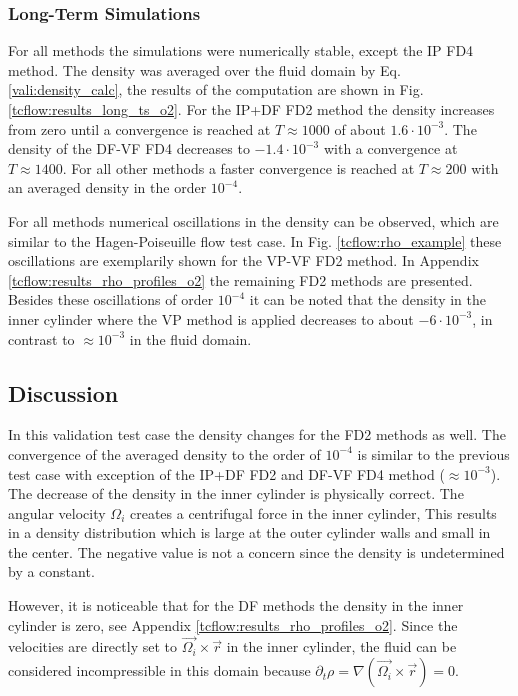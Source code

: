 \clearpage

\subsubsection{Long-Term Simulations}

For all methods the simulations were numerically stable, except the IP FD4 method.
The density was averaged over the fluid domain by Eq. \ref{vali:density_calc},
the results of the computation are shown in Fig. \ref{tcflow:results_long_ts_o2}.
For the IP+DF FD2 method the density increases from zero until a convergence is reached at $T\approx 1000$ of about $1.6\cdot10^{-3}$.
The density of the  DF-VF FD4 decreases to $-1.4\cdot10^{-3}$ with a convergence at $T\approx1400$.
For all other methods a faster convergence is reached at $T\approx200$ with an  averaged density in the order $10^{-4}$.

For all methods numerical oscillations in the density can be
observed, which  are similar to the Hagen-Poiseuille flow test case.
In Fig. \ref{tcflow:rho_example} these oscillations are exemplarily shown for the VP-VF FD2 method.
In Appendix \ref{tcflow:results_rho_profiles_o2} the remaining FD2 methods are presented.
Besides these oscillations of order $10^{-4}$ it can be noted that the density in the inner cylinder
where the VP method is applied decreases to about $-6\cdot10^{-3}$, in contrast to $\approx10^{-3}$ in the fluid domain.

\subsection{Discussion}

In this validation test case the density changes for the FD2 methods as well.
The convergence of the averaged density to the order of $10^{-4}$
is similar to the previous test case with exception of the IP+DF FD2 and DF-VF FD4 method ($\approx10^{-3}$).
The decrease of the density in the inner cylinder is physically correct.
The angular velocity $\Omega_i$ creates a centrifugal force in the inner cylinder,
This results in a density distribution which is large at the outer cylinder walls and small in the center.
The negative value is not a concern since the density is undetermined by a constant.

However, it is noticeable that for the DF methods the density in the inner cylinder is zero, see Appendix \ref{tcflow:results_rho_profiles_o2}.
Since the velocities are directly set to $\vec{\Omega_i} \times \vec{r}$ in the inner cylinder,
the fluid can be considered incompressible in this domain because $\partial_t \rho = \nabla (\vec{\Omega_i} \times \vec{r}) = 0$.

